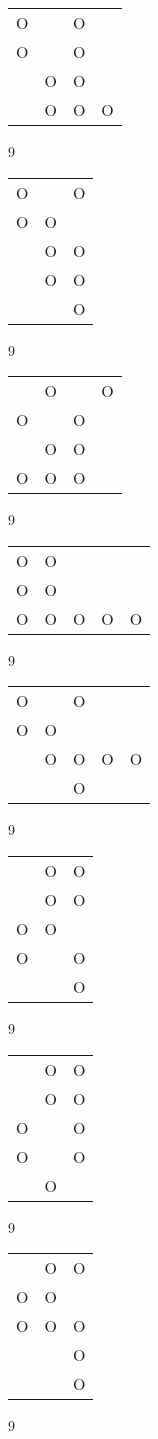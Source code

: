 \begin{tabular}{|m{0.2cm}m{0.2cm}m{0.2cm}m{0.2cm}|}\hline
O& &O& \\
O& &O& \\
 &O&O& \\
 &O&O&O\\
\hline\end{tabular}9
\begin{tabular}{|m{0.2cm}m{0.2cm}m{0.2cm}|}\hline
O& &O\\
O&O& \\
 &O&O\\
 &O&O\\
 & &O\\
\hline\end{tabular}9
\begin{tabular}{|m{0.2cm}m{0.2cm}m{0.2cm}m{0.2cm}|}\hline
 &O& &O\\
O& &O& \\
 &O&O& \\
O&O&O& \\
\hline\end{tabular}9
\begin{tabular}{|m{0.2cm}m{0.2cm}m{0.2cm}m{0.2cm}m{0.2cm}|}\hline
O&O& & & \\
O&O& & & \\
O&O&O&O&O\\
\hline\end{tabular}9
\begin{tabular}{|m{0.2cm}m{0.2cm}m{0.2cm}m{0.2cm}m{0.2cm}|}\hline
O& &O& & \\
O&O& & & \\
 &O&O&O&O\\
 & &O& & \\
\hline\end{tabular}9
\begin{tabular}{|m{0.2cm}m{0.2cm}m{0.2cm}|}\hline
 &O&O\\
 &O&O\\
O&O& \\
O& &O\\
 & &O\\
\hline\end{tabular}9
\begin{tabular}{|m{0.2cm}m{0.2cm}m{0.2cm}|}\hline
 &O&O\\
 &O&O\\
O& &O\\
O& &O\\
 &O& \\
\hline\end{tabular}9
\begin{tabular}{|m{0.2cm}m{0.2cm}m{0.2cm}|}\hline
 &O&O\\
O&O& \\
O&O&O\\
 & &O\\
 & &O\\
\hline\end{tabular}9
